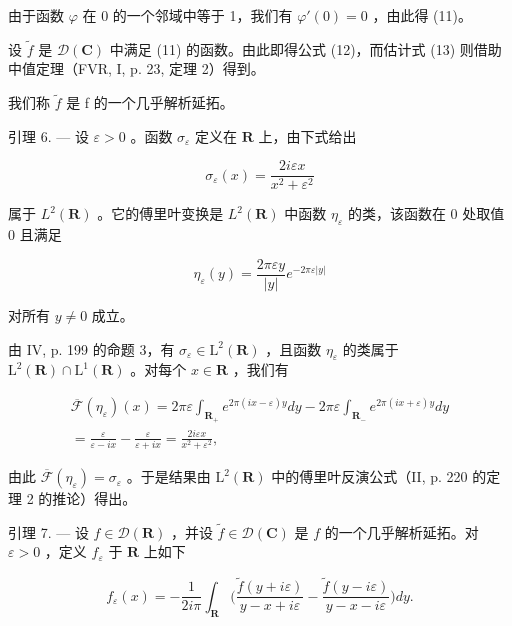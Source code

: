 由于函数 \(\varphi\) 在 0 的一个邻域中等于 1，我们有 \(\varphi'(0) = 0\) ，由此得 (11)。

设 \(\tilde{f}\) 是 \(\mathcal{D}(\mathbf{C})\) 中满足 (11) 的函数。由此即得公式 (12)，而估计式 (13) 则借助中值定理（FVR, I, p. 23, 定理 2）得到。

我们称 \(\tilde{f}\) 是 f 的一个几乎解析延拓。

引理 6. --- 设 \(\varepsilon > 0\) 。函数 \(\sigma_{\varepsilon}\) 定义在 \(\mathbf{R}\) 上，由下式给出

\[
\sigma_ {\varepsilon} (x) = \frac {2 i \varepsilon x}{x ^ {2} + \varepsilon^ {2}}
\]

属于 \(L^{2}(\mathbf{R})\) 。它的傅里叶变换是 \(L^{2}(\mathbf{R})\) 中函数 \(\eta_{\varepsilon}\) 的类，该函数在 0 处取值 0 且满足

\[
\eta_ {\varepsilon} (y) = \frac {2 \pi \varepsilon y}{| y |} e ^ {- 2 \pi \varepsilon | y |}
\]

对所有 \(y \neq 0\) 成立。

由 IV, p. 199 的命题 3，有 \(\sigma_{\varepsilon} \in \mathrm{L}^{2}(\mathbf{R})\) ，且函数 \(\eta_{\varepsilon}\) 的类属于 \(\mathrm{L}^{2}(\mathbf{R}) \cap \mathrm{L}^{1}(\mathbf{R})\) 。对每个 \(x \in \mathbf{R}\) ，我们有

\[
\begin{array}{r} \overline {{\mathcal {F}}} (\eta_ {\varepsilon}) (x) = 2 \pi \varepsilon \int_ {\mathbf {R} _ {+}} e ^ {2 \pi (i x - \varepsilon) y} d y - 2 \pi \varepsilon \int_ {\mathbf {R} _ {-}} e ^ {2 \pi (i x + \varepsilon) y} d y \\ = \frac {\varepsilon}{\varepsilon - i x} - \frac {\varepsilon}{\varepsilon + i x} = \frac {2 i \varepsilon x}{x ^ {2} + \varepsilon^ {2}}, \end{array}
\]

由此 \(\overline{\mathcal{F}}(\eta_{\varepsilon}) = \sigma_{\varepsilon}\) 。于是结果由 \(\mathrm{L}^2(\mathbf{R})\) 中的傅里叶反演公式（II, p. 220 的定理 2 的推论）得出。

引理 7. --- 设 \(f \in \mathcal{D}(\mathbf{R})\) ，并设 \(\widetilde{f} \in \mathcal{D}(\mathbf{C})\) 是 \(f\) 的一个几乎解析延拓。对 \(\varepsilon > 0\) ，定义 \(f_{\varepsilon}\) 于 \(\mathbf{R}\) 上如下

\[
f _ {\varepsilon} (x) = - \frac {1}{2 i \pi} \int_ {\mathbf {R}} \biggl (\frac {\widetilde {f} (y + i \varepsilon)}{y - x + i \varepsilon} - \frac {\widetilde {f} (y - i \varepsilon)}{y - x - i \varepsilon} \biggr) d y.
\]

